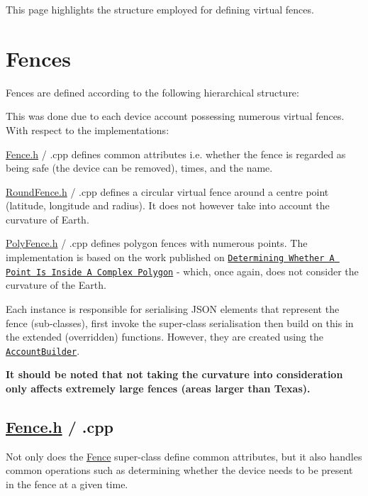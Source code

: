 This page highlights the structure employed for defining virtual fences.

\section*{Fences}

Fences are defined according to the following hierarchical structure\+:



This was done due to each device account possessing numerous virtual fences. With respect to the implementations\+:


\begin{DoxyItemize}
\item \hyperlink{_fence_8h}{Fence.\+h} / .cpp defines common attributes i.\+e. whether the fence is regarded as being safe (the device can be removed), times, and the name.
\item \hyperlink{_round_fence_8h}{Round\+Fence.\+h} / .cpp defines a circular virtual fence around a centre point (latitude, longitude and radius). It does not however take into account the curvature of Earth.
\item \hyperlink{_poly_fence_8h}{Poly\+Fence.\+h} / .cpp defines polygon fences with numerous points. The implementation is based on the work published on \href{http://alienryderflex.com/polygon/?fbclid=IwAR1iLUkzQZnRRCWvPyUjvrYXU6W259FduDmq8NhDPSHMaUAtOmUnE_HEoAA}{\tt Determining Whether A Point Is Inside A Complex Polygon} -\/ which, once again, does not consider the curvature of the Earth.
\end{DoxyItemize}

Each instance is responsible for serialising J\+S\+ON elements that represent the fence (sub-\/classes), first invoke the super-\/class serialisation then build on this in the extended (overridden) functions. However, they are created using the \href{https://github.com/itsBelinda/ENG5220-2020-Team13/wiki/Account-Management}{\tt Account\+Builder}.

{\bfseries It should be noted that not taking the curvature into consideration only affects extremely large fences (areas larger than Texas).}

\subsection*{\hyperlink{_fence_8h}{Fence.\+h} / .cpp}

Not only does the \hyperlink{class_fence}{Fence} super-\/class define common attributes, but it also handles common operations such as determining whether the device needs to be present in the fence at a given time.


